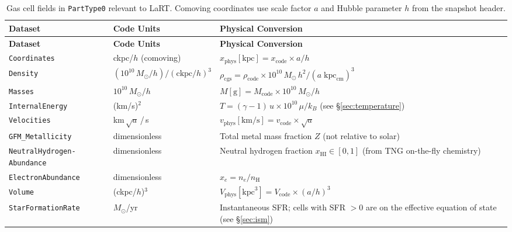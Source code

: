 \documentclass[english,a4paper]{my_memo}
\begin{document}
\begin{longtable}{p{4.5cm}p{3.8cm}p{6.2cm}}
\caption{Gas cell fields in \texttt{PartType0} relevant to LaRT.
Comoving coordinates use scale factor $a$ and Hubble parameter $h$
from the snapshot header.}
\label{tab:fields} \\
\toprule
\textbf{Dataset} & \textbf{Code Units} & \textbf{Physical Conversion} \\
\midrule
\endfirsthead
\toprule
\textbf{Dataset} & \textbf{Code Units} & \textbf{Physical Conversion} \\
\midrule
\endhead
\texttt{Coordinates}
  & ckpc/$h$ (comoving)
  & $x_\mathrm{phys}[\mathrm{kpc}] = x_\mathrm{code} \times a / h$ \\[3pt]

\texttt{Density}
  & $(10^{10}\,M_\odot/h) / (\mathrm{ckpc}/h)^3$
  & $\rho_\mathrm{cgs} = \rho_\mathrm{code} \times
     10^{10}\,M_\odot\,h^2 / (a\;\mathrm{kpc}_\mathrm{cm})^3$ \\[3pt]

\texttt{Masses}
  & $10^{10}\,M_\odot/h$
  & $M[\mathrm{g}] = M_\mathrm{code} \times 10^{10}\,M_\odot / h$ \\[3pt]

\texttt{InternalEnergy}
  & (km/s)$^2$
  & $T = (\gamma - 1)\,u\times 10^{10}\,\mu / k_B$
    (see \S\ref{sec:temperature}) \\[3pt]

\texttt{Velocities}
  & km\,$\sqrt{a}$\,/\,s
  & $v_\mathrm{phys}[\mathrm{km/s}] = v_\mathrm{code} \times \sqrt{a}$ \\[3pt]

\texttt{GFM\_Metallicity}
  & dimensionless
  & Total metal mass fraction $Z$ (not relative to solar) \\[3pt]

\texttt{NeutralHydrogen-}\newline\texttt{Abundance}
  & dimensionless
  & Neutral hydrogen fraction $x_\mathrm{HI} \in [0,1]$
    (from TNG on-the-fly chemistry) \\[3pt]

\texttt{ElectronAbundance}
  & dimensionless
  & $x_e = n_e / n_\mathrm{H}$ \\[3pt]

\texttt{Volume}
  & (ckpc/$h$)$^3$
  & $V_\mathrm{phys}[\mathrm{kpc}^3] = V_\mathrm{code} \times (a/h)^3$ \\[3pt]

\texttt{StarFormationRate}
  & $M_\odot$/yr
  & Instantaneous SFR; cells with SFR $> 0$ are on the effective
    equation of state (see \S\ref{sec:ism}) \\
\bottomrule
\end{longtable}
\end{document}
